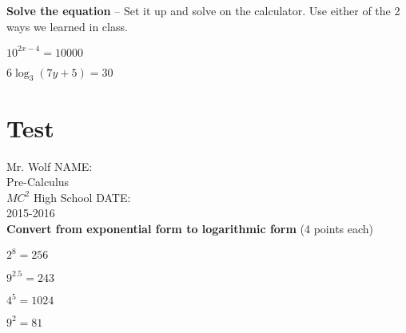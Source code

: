 \documentclass[12pt]{article}
\begin{document}
\textbf{Solve the equation} -- Set it up and solve on the calculator. Use either of the 2 ways we learned in class.\\

\begin{enumerate}[resume]
\begin{multicols}{2}
	\setlength\itemsep{2cm}
	

	\item $10^{2x-4}=10000$\\
	
	\item $6\log_{3}(7y+5)=30$\\
	

\end{multicols}
\end{enumerate}

\section{Test}

\vspace{12pt}

Mr. Wolf \hfill NAME:\underline{\hspace{3in}}\\ 
Pre-Calculus \\ 
$MC^2$ High School \hfill DATE:\underline{\hspace{2in}}\\
2015-2016\\

\textbf{Convert from exponential form to logarithmic form} (4 points each)\\

\begin{enumerate}
\begin{multicols}{2}
	\setlength\itemsep{2cm}
	
	\item $2^{8}=256$\\
	
	\item $9^{2.5}=243$\\
	
	\item $4^5=1024$\\
	
	\item $9^2=81$\\

\end{multicols}
\end{enumerate}
\end{document}

